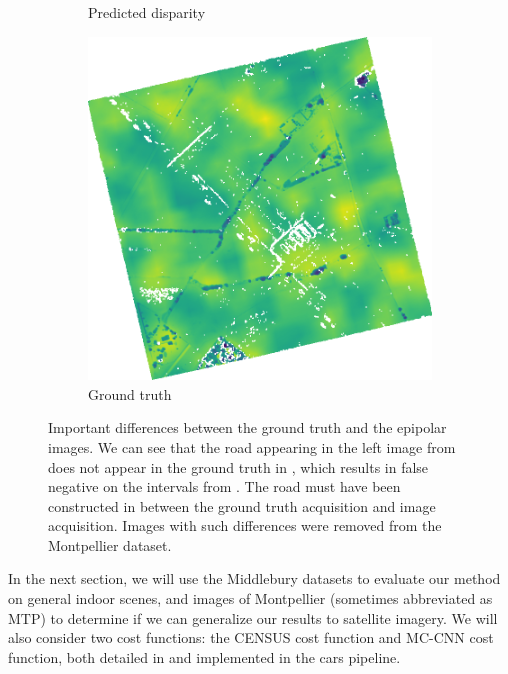 \begin{figure}[ht!]
\begin{subfigure}[t]{0.4\linewidth}
        \caption{Predicted disparity}
        \label{fig:mtp_278_c}
    \end{subfigure}\hfill
    \begin{subfigure}[t]{0.4\linewidth}
        \centering
        \includegraphics[width=\linewidth]{Images/Chap_5/img_error_MTP_278_gt.png}
        \caption{Ground truth}
        \label{fig:mtp_278_d}
    \end{subfigure}
    \caption{Important differences between the ground truth and the epipolar images. We can see that the road appearing in the left image from  does not appear in the ground truth in , which results in false negative on the intervals from . The road must have been constructed in between the ground truth acquisition and image acquisition. Images with such differences were removed from the Montpellier dataset.} 
    \label{fig:mtp_278}
\end{figure}

In the next section, we will use the Middlebury datasets to evaluate our method on general indoor scenes, and images of Montpellier (sometimes abbreviated as $\mathrm{MTP}$) to determine if we can generalize our results to satellite imagery. We will also consider two cost functions: the CENSUS cost function and MC-CNN cost function, both detailed in  and implemented in the \acrshort{cars} pipeline.

